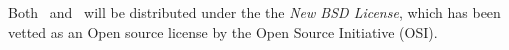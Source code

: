 \documentclass[11pt,letterpaper]{article}
\begin{document}
 Both \cello\ and \enzoii\ will be
distributed under the the \textit{New BSD License}, which has been
vetted as an Open source license by the Open Source Initiative (OSI).


\newpage
\setcounter{page}{1}
\raggedright

%
\end{document}
